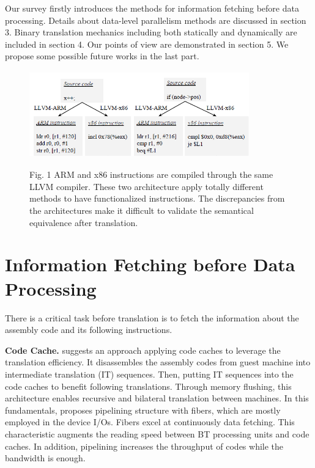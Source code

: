 \documentclass[sigconf, nonacm, natbib=false]{acmart}
\begin{document}
Our survey firstly introduces the methods for information fetching before data processing. Details about data-level parallelism methods are discussed in section 3. Binary translation mechanics including both statically and dynamically are included in section 4. Our points of view are demonstrated in section 5. We propose some possible future works in the last part.

\begin{figure}[ht]
\begin{center}
\includegraphics[height=3.75cm, width=9.5cm]{pic1.PNG}
\end{center}
{\footnotesize Fig. 1 ARM and x86 instructions are compiled through the same LLVM compiler. These two architecture apply totally different methods to have functionalized instructions. The discrepancies from the architectures make it difficult to validate the semantical equivalence after translation.}
\end{figure}

\section{Information Fetching before Data Processing}
There is a critical task before translation is to fetch the information about the assembly code and its following instructions.

\textbf{Code Cache.} \parencite{code_cache_1} suggests an approach applying code caches to leverage the translation efficiency. It disassembles the assembly codes from guest machine into intermediate translation (IT) sequences. Then, putting IT sequences into the code caches to benefit following translations. Through memory flushing, this architecture enables recursive and bilateral translation between machines. In this fundamentals, \parencite{code_cache_with_fiber} proposes pipelining structure with fibers, which are mostly employed in the device I/Os. Fibers excel at continuously data fetching. This characteristic augments the reading speed between BT processing units and code caches. In addition, pipelining increases the throughput of codes while the bandwidth is enough.
\end{document}
